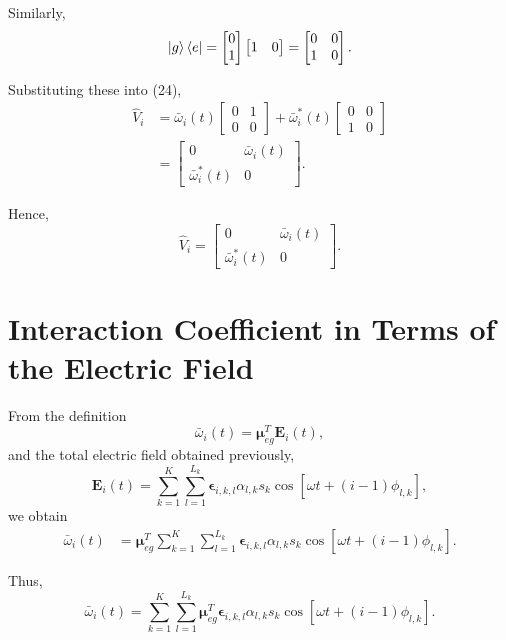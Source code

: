 \documentclass[12pt,a4paper]{article}
\newcommand{\ketg}{\left|g\right\rangle}
\begin{document}
Similarly,
\[
\ketg\bra e
=
\begin{bmatrix}
0\\
1
\end{bmatrix}
\begin{bmatrix}
1&0
\end{bmatrix}
=
\begin{bmatrix}
0&0\\
1&0
\end{bmatrix}.
\]

Substituting these into (24),
\[
\begin{aligned}
\hat V_i
&=
\bar{\omega}_i(t)
\begin{bmatrix}
0&1\\
0&0
\end{bmatrix}
+
\bar{\omega}_i^{*}(t)
\begin{bmatrix}
0&0\\
1&0
\end{bmatrix}\\
&=
\begin{bmatrix}
0&\bar{\omega}_i(t)\\
\bar{\omega}_i^{*}(t)&0
\end{bmatrix}.
\end{aligned}
\]

Hence,
\begin{equation}
\boxed{
\hat V_i
=
\begin{bmatrix}
0&\bar{\omega}_i(t)\\
\bar{\omega}_i^{*}(t)&0
\end{bmatrix}.
}
\tag{25}
\end{equation}


\section{Interaction Coefficient in Terms of the Electric Field}

From the definition
\[
\bar{\omega}_i(t)
=
\boldsymbol{\mu}_{eg}^{T}\mathbf E_i(t),
\]
and the total electric field obtained previously,
\[
\mathbf E_i(t)
=
\sum_{k=1}^{K}
\sum_{l=1}^{L_k}
\boldsymbol{\epsilon}_{i,k,l}
\alpha_{l,k}s_k
\cos
\left[
\omega t+(i-1)\phi_{l,k}
\right],
\]
we obtain
\[
\begin{aligned}
\bar{\omega}_i(t)
&=
\boldsymbol{\mu}_{eg}^{T}
\sum_{k=1}^{K}
\sum_{l=1}^{L_k}
\boldsymbol{\epsilon}_{i,k,l}
\alpha_{l,k}s_k
\cos
\left[
\omega t+(i-1)\phi_{l,k}
\right].
\end{aligned}
\]

Thus,
\begin{equation}
\boxed{
\bar{\omega}_i(t)
=
\sum_{k=1}^{K}
\sum_{l=1}^{L_k}
\boldsymbol{\mu}_{eg}^{T}
\boldsymbol{\epsilon}_{i,k,l}
\alpha_{l,k}s_k
\cos
\left[
\omega t+(i-1)\phi_{l,k}
\right].
}
\tag{26}
\end{equation}
\end{document}
